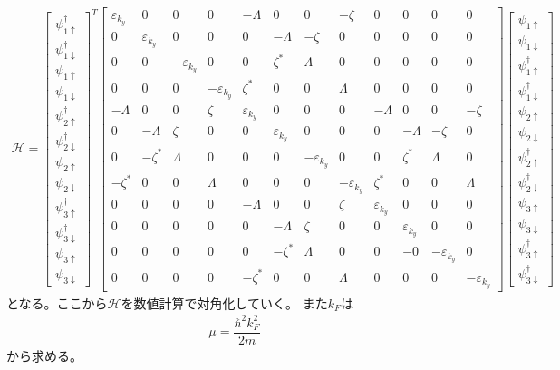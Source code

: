 \documentclass{jarticle}
\begin{document}
\begin{align}
\mathcal{H}=
\begin{bmatrix}
\psi_{1\uparrow}^\dagger \\ 
\psi_{1\downarrow}^\dagger \\ 
\psi_{1\uparrow} \\ 
\psi_{1\downarrow} \\ 
\psi_{2\uparrow}^\dagger \\ 
\psi_{2\downarrow}^\dagger \\ 
\psi_{2\uparrow} \\ 
\psi_{2\downarrow} \\ 
\psi_{3\uparrow}^\dagger \\ 
\psi_{3\downarrow}^\dagger \\ 
\psi_{3\uparrow} \\ 
\psi_{3\downarrow}
\end{bmatrix} 
^T
\begin{bmatrix}
\varepsilon_{k_y} & 0 & 0 & 0 & -\Lambda & 0 & 0 & -\zeta & 0 & 0 & 0 & 0 \\ 
0 & \varepsilon_{k_y} & 0 & 0 & 0 & -\Lambda & -\zeta & 0 & 0 & 0 & 0 & 0 \\ 
0 & 0 & -\varepsilon_{k_y} & 0 & 0 & \zeta^{*} & \Lambda & 0 & 0 & 0 & 0 & 0 \\ 
0 & 0 & 0 & -\varepsilon_{k_y} & \zeta^{*} & 0 & 0 & \Lambda & 0 & 0 & 0 & 0 \\ 
-\Lambda & 0 & 0 & \zeta & \varepsilon_{k_y} & 0 & 0 & 0 & -\Lambda & 0 & 0 & -\zeta \\ 
0 & -\Lambda & \zeta & 0 & 0 & \varepsilon_{k_y} & 0 & 0 & 0 & -\Lambda & -\zeta & 0 \\ 
0 & -\zeta^{*} & \Lambda & 0 & 0 & 0 & -\varepsilon_{k_y} & 0 & 0 & \zeta^{*} & \Lambda & 0 \\ 
-\zeta^{*} & 0 & 0 & \Lambda & 0 & 0 & 0 & -\varepsilon_{k_y} & \zeta^{*} & 0 & 0 & \Lambda \\ 
0 & 0 & 0 & 0 & -\Lambda & 0 & 0 & \zeta & \varepsilon_{k_y} & 0 & 0 & 0 \\ 
0 & 0 & 0 & 0 & 0 & -\Lambda & \zeta & 0 & 0 & \varepsilon_{k_y} & 0 & 0 \\ 
0 & 0 & 0 & 0 & 0 & -\zeta^{*} & \Lambda & 0 & 0 & -0 & -\varepsilon_{k_y} & 0 \\ 
0 & 0 & 0 & 0 & -\zeta^{*} & 0 & 0 & \Lambda & 0 & 0 & 0 & -\varepsilon_{k_y}
\end{bmatrix} 
\begin{bmatrix}
\psi_{1\uparrow} \\ 
\psi_{1\downarrow} \\ 
\psi_{1\uparrow}^\dagger \\ 
\psi_{1\downarrow}^\dagger \\ 
\psi_{2\uparrow} \\ 
\psi_{2\downarrow} \\ 
\psi_{2\uparrow}^\dagger \\ 
\psi_{2\downarrow}^\dagger \\ 
\psi_{3\uparrow} \\ 
\psi_{3\downarrow} \\ 
\psi_{3\uparrow}^\dagger \\ 
\psi_{3\downarrow}^\dagger
\end{bmatrix} 
\end{align}
となる。ここから$\mathcal{H}$を数値計算で対角化していく。
また$k_{F}$は
\begin{align}
\mu=\dfrac{\hbar^{2}k_F^{2}}{2m}
\end{align}
から求める。
\end{document}
